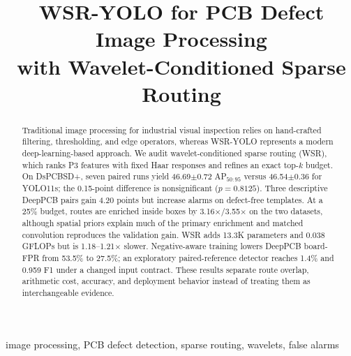 \documentclass[conference]{IEEEtran}
\begin{document}
\title{WSR-YOLO for PCB Defect Image Processing\\with Wavelet-Conditioned Sparse Routing}
\author{
}
\maketitle

\begin{abstract}
Traditional image processing for industrial visual inspection relies on hand-crafted filtering, thresholding, and edge operators, whereas WSR-YOLO represents a modern deep-learning-based approach. We audit wavelet-conditioned sparse routing (WSR), which ranks P3 features with fixed Haar responses and refines an exact top-$k$ budget. On DsPCBSD+, seven paired runs yield 46.69$\pm$0.72 AP$_{50:95}$ versus 46.54$\pm$0.36 for YOLO11s; the 0.15-point difference is nonsignificant ($p=0.8125$). Three descriptive DeepPCB pairs gain 4.20 points but increase alarms on defect-free templates. At a 25\% budget, routes are enriched inside boxes by 3.16$\times$/3.55$\times$ on the two datasets, although spatial priors explain much of the primary enrichment and matched convolution reproduces the validation gain. WSR adds 13.3K parameters and 0.038 GFLOPs but is 1.18--1.21$\times$ slower. Negative-aware training lowers DeepPCB board-FPR from 53.5\% to 27.5\%; an exploratory paired-reference detector reaches 1.4\% and 0.959 F1 under a changed input contract. These results separate route overlap, arithmetic cost, accuracy, and deployment behavior instead of treating them as interchangeable evidence.
\end{abstract}

\begin{IEEEkeywords}
image processing, PCB defect detection, sparse routing, wavelets, false alarms
\end{IEEEkeywords}
\end{document}
